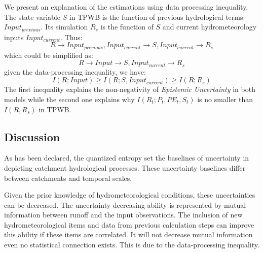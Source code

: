 \documentclass[11pt]{article}
\begin{document}
We present an explanation of the estimations using data processing inequality. The state variable $S$ in TPWB is the function of previous hydrological terms $Input_{previous}$. Its simulation $R_s$ is the function of $S$ and current hydrometeorology inputs $Input_{current}$. Thus:
\begin{equation}
R \rightarrow Input_{previous},Input_{current} \rightarrow S,Input_{current} \rightarrow R_s
\end{equation}
which could be simplified  as:
 \begin{equation}
R \rightarrow Input \rightarrow S,Input_{current} \rightarrow R_s
\end{equation}
given the data-processing inequality, we have:
\begin{equation}
\label{ie2}
I(R;Input)\geq I(R;S,Input_{current}) \geq I(R;R_s)
\end{equation}
The first inequality explains the non-negativity of \emph{Epistemic Uncertainty} in both models while the second one explains why $I(R_t;P_t,PE_t,S_t)$ is no smaller than $I(R,R_s)$ in TPWB.








\iffalse

\newpage
\begin{center}
\section{Discussion}
\end{center}

As has been declared, the quantized entropy set the baselines of uncertainty in depicting catchment hydrological processes. These uncertainty baselines differ between catchments and temporal scales. 



Given the prior knowledge of hydrometeorological conditions, these uncertainties can be decreased. The uncertainty decreasing ability is represented by mutual information between runoff and the input observations. The inclusion of new hydrometeorological items and data from previous calculation steps can improve this ability if these items are correlated. It will not decrease mutual information even no statistical connection exists. This is due to the data-processing inequality\cite{cover2012elements}.  
\end{document}
